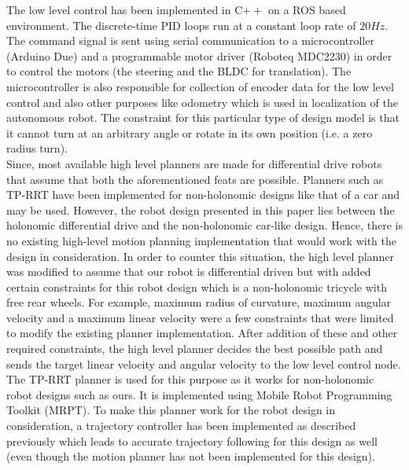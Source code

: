 \documentclass[conference]{IEEEtran}
\begin{document}

The low level control has been implemented in C$++$ on a ROS based environment. The discrete-time PID loops run at a constant loop rate of $20Hz$. The command signal is sent using serial communication to a microcontroller (Arduino Due) and a programmable motor driver (Roboteq MDC2230) in order to control the motors (the steering and the BLDC for translation). The microcontroller is also responsible for collection of encoder data for the low level control and also other purposes like odometry which is used in localization of the autonomous robot. The constraint for this particular type of design model is that it cannot turn at an arbitrary angle or rotate in its own position (i.e. a zero radius turn).\\
Since, most  available high level planners are made for differential drive robots that assume that both the aforementioned feats are possible. Planners such as TP-RRT \cite{tp-rrt} have been implemented for non-holonomic designs like that of a car and may be used. However, the robot design presented in this paper lies between the holonomic differential drive and the non-holonomic car-like design. Hence, there is no existing high-level motion planning implementation that would work with the design in consideration. In order to counter this situation, the high level planner was modified to assume that our robot is differential driven but with added certain constraints for this robot design which is a non-holonomic tricycle with free rear wheels. For example, maximum radius of curvature, maximum angular velocity and a maximum linear velocity were a few constraints that were limited to modify the existing planner implementation. After addition of these and other required constraints, the high level planner decides the best possible path and sends the target linear velocity and angular velocity to the low level control node. The TP-RRT planner is used for this purpose as it works for non-holonomic robot designs such as ours. It is implemented using Mobile Robot Programming Toolkit (MRPT). To make this planner work for the robot design in consideration, a trajectory controller has been implemented as described previously which leads to accurate trajectory following for this design as well (even though the motion planner has not been implemented for this design). 
\end{document}
